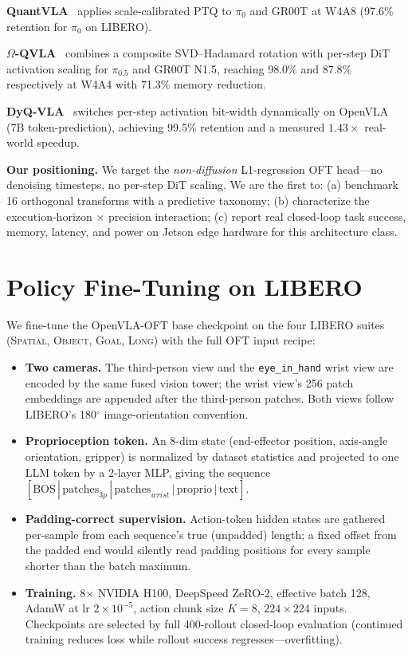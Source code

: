 \documentclass[conference]{IEEEtran}
\begin{document}
\textbf{QuantVLA}~\cite{quantvla} applies scale-calibrated PTQ to $\pi_0$
and GR00T at W4A8 (97.6\% retention for $\pi_0$ on LIBERO).

\textbf{$\Omega$-QVLA}~\cite{omegaqvla} combines a composite SVD--Hadamard
rotation with per-step DiT activation scaling for $\pi_{0.5}$ and GR00T N1.5, reaching
98.0\% and 87.8\% respectively at W4A4 with 71.3\% memory reduction.

\textbf{DyQ-VLA}~\cite{dyqvla} switches per-step activation bit-width
dynamically on OpenVLA (7B token-prediction), achieving 99.5\% retention and a measured
$1.43\times$ real-world speedup.

\textbf{Our positioning.} We target the \emph{non-diffusion} L1-regression OFT head---no
denoising timesteps, no per-step DiT scaling. We are the first to: (a) benchmark 16
orthogonal transforms with a predictive taxonomy; (b) characterize the execution-horizon
$\times$ precision interaction; (c) report real closed-loop task success, memory, latency,
and power on Jetson edge hardware for this architecture class.

\section{Policy Fine-Tuning on LIBERO}
\label{sec:finetune}

We fine-tune the OpenVLA-OFT base checkpoint on the four LIBERO suites
(\textsc{Spatial}, \textsc{Object}, \textsc{Goal}, \textsc{Long}) with the full OFT input
recipe:

\begin{itemize}
  \item \textbf{Two cameras.} The third-person view and the \texttt{eye\_in\_hand} wrist
        view are encoded by the same fused vision tower; the wrist view's 256 patch
        embeddings are appended after the third-person patches. Both views follow
        LIBERO's 180$^\circ$ image-orientation convention.
  \item \textbf{Proprioception token.} An 8-dim state (end-effector position, axis-angle
        orientation, gripper) is normalized by dataset statistics and projected to one
        LLM token by a 2-layer MLP, giving the sequence
        $[\text{BOS}\,|\,\text{patches}_{3p}\,|\,\text{patches}_{wrist}\,|\,
        \text{proprio}\,|\,\text{text}]$.
  \item \textbf{Padding-correct supervision.} Action-token hidden states are gathered
        per-sample from each sequence's true (unpadded) length; a fixed offset from the
        padded end would silently read padding positions for every sample shorter than
        the batch maximum.
  \item \textbf{Training.} 8$\times$ NVIDIA H100, DeepSpeed ZeRO-2, effective batch 128,
        AdamW at lr $2\times10^{-5}$, action chunk size $K=8$, $224\times224$ inputs.
        Checkpoints are selected by full 400-rollout closed-loop evaluation (continued
        training reduces loss while rollout success regresses---overfitting).
\end{itemize}
\end{document}
